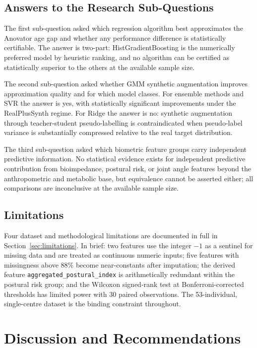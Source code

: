 \documentclass[11pt,a4paper]{report}
\begin{document}
\section{Answers to the Research Sub-Questions}

The first sub-question asked which regression algorithm best approximates the Anovator age gap and
whether any performance difference is statistically certifiable. The answer is two-part:
HistGradientBoosting is the numerically preferred model by heuristic ranking, and no algorithm can
be certified as statistically superior to the others at the available sample size.

The second sub-question asked whether GMM synthetic augmentation improves approximation quality and
for which model classes. For ensemble methods and SVR the answer is yes, with statistically
significant improvements under the RealPlusSynth regime. For Ridge the answer is no: synthetic
augmentation through teacher-student pseudo-labelling is contraindicated when pseudo-label variance
is substantially compressed relative to the real target distribution.

The third sub-question asked which biometric feature groups carry independent predictive information.
No statistical evidence exists for independent predictive contribution from bioimpedance, postural
risk, or joint angle features beyond the anthropometric and metabolic base, but equivalence cannot
be asserted either; all comparisons are inconclusive at the available sample size.

\section{Limitations}

Four dataset and methodological limitations are documented in full in Section~\ref{sec:limitations}. In brief: two
features use the integer $-1$ as a sentinel for missing data and are treated as continuous numeric
inputs; five features with missingness above 88\% become near-constants after imputation; the
derived feature \texttt{aggregated\_postural\_index} is arithmetically redundant within the postural
risk group; and the Wilcoxon signed-rank test at Bonferroni-corrected thresholds has limited power
with 30 paired observations. The 53-individual, single-centre dataset is the binding constraint
throughout.

\chapter{Discussion and Recommendations}
\end{document}
